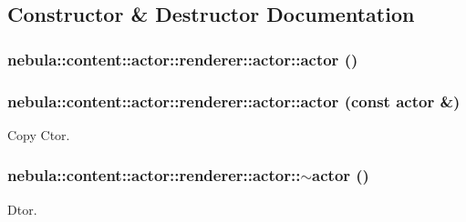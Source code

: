 \subsection{Constructor \& Destructor Documentation}
\hypertarget{classnebula_1_1content_1_1actor_1_1renderer_1_1actor_aacf637f097dea13f236dd10e90568ac2}{
\subsubsection[{actor}]{\setlength{\rightskip}{0pt plus 5cm}nebula::content::actor::renderer::actor::actor ()}}
\label{classnebula_1_1content_1_1actor_1_1renderer_1_1actor_aacf637f097dea13f236dd10e90568ac2}
\hypertarget{classnebula_1_1content_1_1actor_1_1renderer_1_1actor_a5a58a3555552d490357a2a075c524b81}{
\subsubsection[{actor}]{\setlength{\rightskip}{0pt plus 5cm}nebula::content::actor::renderer::actor::actor (const {\bf actor} \&)}}
\label{classnebula_1_1content_1_1actor_1_1renderer_1_1actor_a5a58a3555552d490357a2a075c524b81}


Copy Ctor. \hypertarget{classnebula_1_1content_1_1actor_1_1renderer_1_1actor_ac4b87aa931f3d49ce6bb96f27e541591}{
\subsubsection[{$\sim$actor}]{\setlength{\rightskip}{0pt plus 5cm}nebula::content::actor::renderer::actor::$\sim$actor ()}}
\label{classnebula_1_1content_1_1actor_1_1renderer_1_1actor_ac4b87aa931f3d49ce6bb96f27e541591}


Dtor. 

